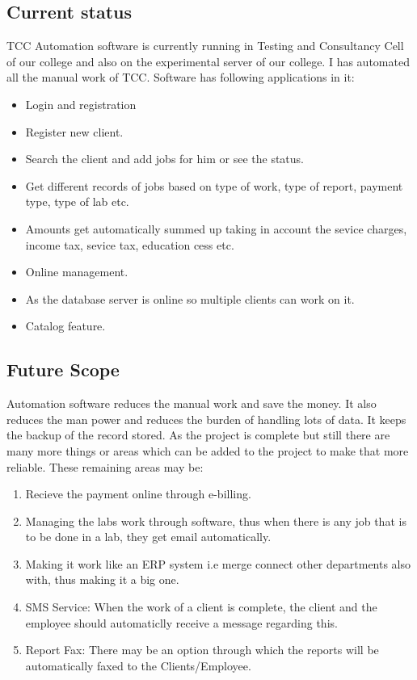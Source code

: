 \subsection{Current status}
TCC Automation software is currently running in Testing and Consultancy Cell of our college and also on the experimental server of our college. I has automated all the manual work of TCC.
    Software has following applications in it:
\begin{itemize}
\item Login and registration
\item Register new client.
\item Search the client and add jobs for him or see the status.
\item Get different records of jobs based on type of work, type of report, payment type, type of lab etc.
\item Amounts get automatically summed up taking in account the sevice charges, income tax, sevice tax, education cess etc.
\item Online management.
\item As the database server is online so multiple clients can work on it.
\item Catalog feature.
\end{itemize}
\newpage 
\subsection{Future Scope}
Automation software reduces the manual work and save the money. It also reduces the man power and reduces the burden of handling lots of data. It keeps the backup of the record stored. As the project is complete but still there are many more things or areas
which can be added to the project to make that more reliable. These remaining areas may be:
\begin{enumerate}
\item Recieve the payment online through e-billing.
\item Managing the labs work through software, thus when there is any job that is to be done in a lab, they get email automatically.
\item Making it work like an ERP system i.e merge connect other departments also with, thus making it a big one.
\item SMS Service: When the work of a client is complete, the client and the employee should automaticlly receive a message regarding this.  
\item Report Fax: There may be an option through which the reports will be automatically faxed to the Clients/Employee.
\end{enumerate}


